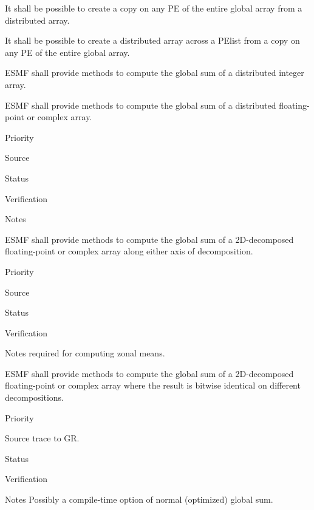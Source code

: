 
It shall be possible to create a copy on any PE of the entire global
array from a distributed array.


It shall be possible to create a distributed array across a PElist
from a copy on any PE of the entire global array.



ESMF shall provide methods to compute the global sum of a distributed
integer array.


ESMF shall provide methods to compute the global sum of a distributed
floating-point or complex array.

\begin{reqlist}
\item[Priority]
\item[Source]
\item[Status]
\item[Verification]
\item[Notes]
\end{reqlist}


ESMF shall provide methods to compute the global sum of a 2D-decomposed
floating-point or complex array along either axis of decomposition.

\begin{reqlist}
\item[Priority]
\item[Source]
\item[Status]
\item[Verification]
\item[Notes] required for computing zonal means.
\end{reqlist}


ESMF shall provide methods to compute the global sum of a
2D-decomposed floating-point or complex array where the result is bitwise
identical on different decompositions. 

\begin{reqlist}
\item[Priority]
\item[Source] trace to GR.
\item[Status]
\item[Verification]
\item[Notes] Possibly a compile-time option of normal (optimized)
             global sum.
\end{reqlist}

